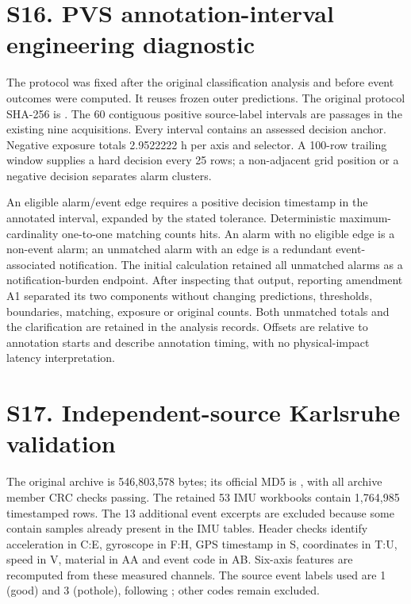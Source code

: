 \section*{S16. PVS annotation-interval engineering diagnostic}
The protocol  was fixed after the original classification analysis and before event outcomes were computed. It reuses frozen outer predictions. The original protocol SHA-256 is . The 60 contiguous positive source-label intervals are passages in the existing nine acquisitions. Every interval contains an assessed decision anchor. Negative exposure totals 2.9522222 h per axis and selector. A 100-row trailing window supplies a hard decision every 25 rows; a non-adjacent grid position or a negative decision separates alarm clusters.

An eligible alarm/event edge requires a positive decision timestamp in the annotated interval, expanded by the stated tolerance. Deterministic maximum-cardinality one-to-one matching counts hits. An alarm with no eligible edge is a non-event alarm; an unmatched alarm with an edge is a redundant event-associated notification. The initial calculation retained all unmatched alarms as a notification-burden endpoint. After inspecting that output, reporting amendment A1 separated its two components without changing predictions, thresholds, boundaries, matching, exposure or original counts. Both unmatched totals and the clarification are retained in the analysis records. Offsets are relative to annotation starts and describe annotation timing, with no physical-impact latency interpretation.


\clearpage
\section*{S17. Independent-source Karlsruhe validation}
The original archive  is 546,803,578 bytes; its official MD5 is , with all archive member CRC checks passing. The retained 53 IMU workbooks contain 1,764,985 timestamped rows. The 13 additional event excerpts are excluded because some contain samples already present in the IMU tables. Header checks identify acceleration in C:E, gyroscope in F:H, GPS timestamp in S, coordinates in T:U, speed in V, material in AA and event code in AB. Six-axis features are recomputed from these measured channels. The source event labels used are 1 (good) and 3 (pothole), following \citet{kitpaper}; other codes remain excluded.

